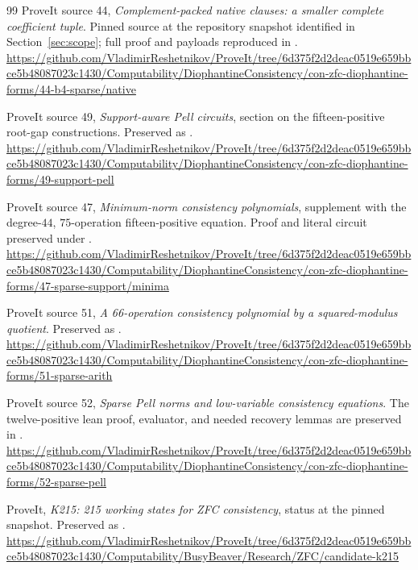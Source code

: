 \documentclass[11pt,a4paper]{article}
\theoremstyle{remark}
\begin{document}
\begin{thebibliography}{99}
ProveIt source 44, \emph{Complement-packed native clauses: a smaller complete
coefficient tuple}. Pinned source at the repository snapshot identified in
Section~\ref{sec:scope}; full proof and payloads reproduced in
.\newline
\url{https://github.com/VladimirReshetnikov/ProveIt/tree/6d375f2d2deac0519e659bbce5b48087023c1430/Computability/DiophantineConsistency/con-zfc-diophantine-forms/44-b4-sparse/native}

ProveIt source 49, \emph{Support-aware Pell circuits}, section on the
fifteen-positive root-gap constructions. Preserved as
.\newline
\url{https://github.com/VladimirReshetnikov/ProveIt/tree/6d375f2d2deac0519e659bbce5b48087023c1430/Computability/DiophantineConsistency/con-zfc-diophantine-forms/49-support-pell}

ProveIt source 47, \emph{Minimum-norm consistency polynomials}, supplement
with the degree-$44$, $75$-operation fifteen-positive equation.
Proof and literal circuit preserved under .\newline
\url{https://github.com/VladimirReshetnikov/ProveIt/tree/6d375f2d2deac0519e659bbce5b48087023c1430/Computability/DiophantineConsistency/con-zfc-diophantine-forms/47-sparse-support/minima}

ProveIt source 51, \emph{A 66-operation consistency polynomial by a
squared-modulus quotient}. Preserved as
.\newline
\url{https://github.com/VladimirReshetnikov/ProveIt/tree/6d375f2d2deac0519e659bbce5b48087023c1430/Computability/DiophantineConsistency/con-zfc-diophantine-forms/51-sparse-arith}

ProveIt source 52, \emph{Sparse Pell norms and low-variable consistency
equations}. The twelve-positive lean proof, evaluator, and needed recovery
lemmas are preserved in .\newline
\url{https://github.com/VladimirReshetnikov/ProveIt/tree/6d375f2d2deac0519e659bbce5b48087023c1430/Computability/DiophantineConsistency/con-zfc-diophantine-forms/52-sparse-pell}

ProveIt, \emph{K215: 215 working states for ZFC consistency}, status at the
pinned snapshot. Preserved as .\newline
\url{https://github.com/VladimirReshetnikov/ProveIt/tree/6d375f2d2deac0519e659bbce5b48087023c1430/Computability/BusyBeaver/Research/ZFC/candidate-k215}


\end{thebibliography}
\end{document}

